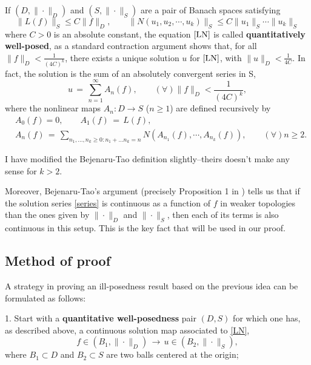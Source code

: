 \documentclass{amsart}
\begin{document}
If  $(D,\|\cdot \|_D)$ and $(S,\|\cdot \|_S)$ are a pair of Banach spaces satisfying 
\begin{equation}
\|L(f)\|_S \leq C \|f\|_D,\qquad \|N(u_{1}, u_{2}, \cdots, u_{k})\|_S \leq C \| u_{1} \|_{S}\cdots\| u_{k} \|_{S} 
\label{estim}
\end{equation}
where $C>0$ is an absolute constant, the equation $\eqref{LN}$ is called \textbf{quantitatively well-posed}, as a standard contraction argument shows that, for all  $\|f\|_D<\frac{1}{(4C)^{k}}$, there exists a unique solution $u$ for $\eqref{LN}$, with $\|u\|_D<\frac{1}{4C}$. In fact, the solution is the sum of an absolutely convergent series in S, 
\begin{equation}
u\,=\,\sum_{n=1}^{\infty} A_n(f), \qquad (\forall) \|f\|_D<\frac{1}{(4C)^k},
\label{series}
\end{equation}
where the nonlinear maps $A_n: D\to S$ ($n\geq 1$) are defined recursively by
\begin{equation}
  \begin{split}
& A_{0}(f)=0, \qquad 
  A_1(f)\,=\,L(f), \qquad 
  \\
  & A_n(f)\,=\,\sum_{n_{1}, \ldots, n_{k} \ge 0: n_{1} + \ldots n_{k} = n} N(A_{n_1}(f),\cdots, A_{n_{k}}(f)), \qquad (\forall)n\geq 2.
\label{An}
\end{split}
\end{equation}
\begin{framed}
  I have modified the Bejenaru-Tao definition slightly--theirs doesn't make any sense for $k >2$. 
\end{framed}
Moreover, Bejenaru-Tao's argument (precisely Proposition 1 in \cite{BT06}) tells us that if the solution series \eqref{series} is continuous as a function of $f$ in  weaker topologies than the ones given by $\| \cdot\|_D$ and $\| \cdot \|_S$, then each of its terms is also continuous in this setup. This is the key fact  that will be used in our proof.

\subsection{Method of proof} A strategy in proving an ill-posedness result based on the previous idea can be formulated as follows:

1. Start with a \textbf{quantitative well-posedness} pair $(D,S)$ for which one has, as described above, a continuous solution map associated to \eqref{LN},
\begin{equation}
f\in (B_1,\|\cdot \|_D)\,\longrightarrow\,u\in (B_2,\|\cdot \|_S),
\end{equation} 
where $B_1\subset D$ and $B_2 \subset S$ are two balls centered at the origin;
\end{document}
